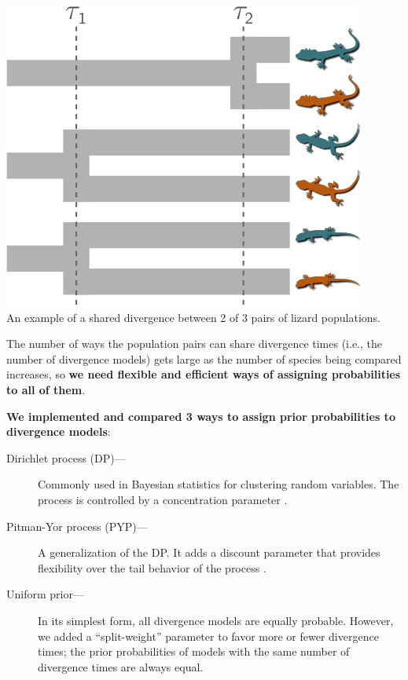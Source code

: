 \documentclass[a0paper,fleqn]{betterposter}
\begin{document}
{\vspace{0.5ex}
\begin{center}
\begin{minipage}[t]{0.6\linewidth}
\includegraphics[width=0.9\linewidth]{../images/from-ecoevolity-tikz-repo/div-model-311-labels.pdf}\\
{\fontsize{28}{35} \selectfont %
An example of a shared divergence between 2 of 3 pairs of lizard populations.}
\end{minipage}
\end{center}

\vspace{1.5ex}
The number of ways the population pairs can share divergence times (i.e., the
number of divergence models) gets large as the number of species being compared
increases\cite{Bell1934}, so \textbf{we need flexible and efficient ways of assigning
    probabilities to all of them}.

\vspace{1.5ex}
\textbf{We implemented and compared 3 ways to assign prior probabilities to divergence
models}:
\vspace{1ex}
\begin{description}
    \item[Dirichlet process (DP)---] Commonly used in Bayesian statistics
        for clustering random variables. The process is controlled by a
        concentration parameter \cite{Ferguson1973, Antoniak1974}.
    \item[Pitman-Yor process (PYP)---] A generalization of the DP.  It adds
        a discount parameter that provides flexibility over the tail behavior
        of the process \cite{PitmanYor1997}.
    \item[Uniform prior---] In its simplest form, all divergence models are
        equally probable. However, we added a ``split-weight'' parameter to
        favor more or fewer divergence times; the prior probabilities of models
        with the same number of divergence times are always equal.
\end{description}


}
\end{document}
